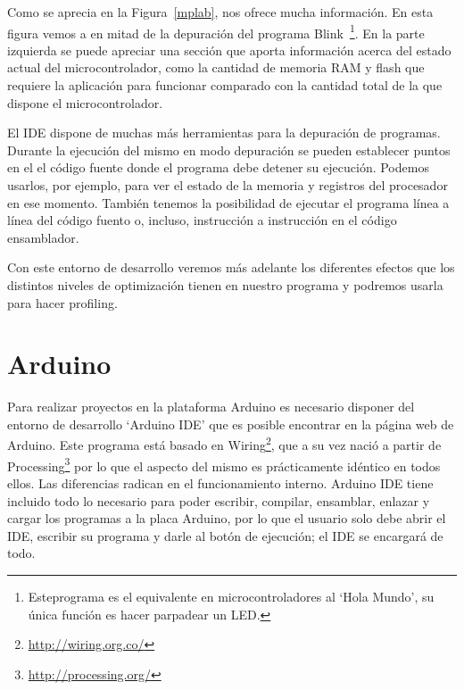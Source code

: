 
Como se aprecia en la Figura~\ref{mplab},  nos ofrece mucha información. En esta figura vemos a  en mitad de la depuración del programa Blink~\footnote{Esteprograma es el equivalente en microcontroladores al `Hola Mundo', su única función es hacer parpadear un LED.}. En la parte izquierda se puede apreciar una sección que aporta información acerca del estado actual del microcontrolador, como la cantidad de memoria RAM y flash que requiere la aplicación para funcionar comparado con la cantidad total de la que dispone el microcontrolador.

El IDE dispone de muchas más herramientas para la depuración de programas. Durante la ejecución del mismo en modo depuración se pueden establecer puntos en el el código fuente donde el programa debe detener su ejecución. Podemos usarlos, por ejemplo, para ver el estado de la memoria y registros del procesador en ese momento. También tenemos la posibilidad de ejecutar el programa línea a línea del código fuento o, incluso, instrucción a instrucción en el código ensamblador.

Con este entorno de desarrollo veremos más adelante los diferentes efectos que los distintos niveles de optimización tienen en nuestro programa y podremos usarla para hacer profiling.

\section{Arduino}
Para realizar proyectos en la plataforma Arduino es necesario disponer del entorno de desarrollo `Arduino IDE' que es posible encontrar en la página web de Arduino. Este programa está basado en Wiring\footnote{\url{http://wiring.org.co/}}, que a su vez nació a partir de Processing\footnote{\url{http://processing.org/}} por lo que el aspecto del mismo es prácticamente idéntico en todos ellos. Las diferencias radican en el funcionamiento interno. Arduino IDE tiene incluido todo lo necesario para poder escribir, compilar, ensamblar, enlazar y cargar los programas a la placa Arduino, por lo que el usuario solo debe abrir el IDE, escribir su programa y darle al botón de ejecución; el IDE se encargará de todo.

